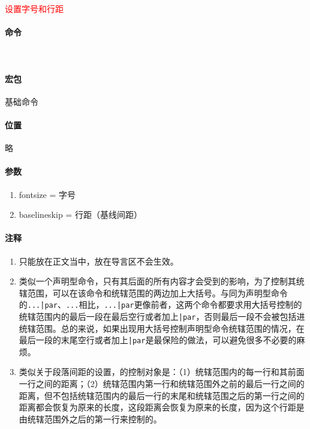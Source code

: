 \documentclass{article}
\newcommand{\mnt}[1]{\texttt{#1}} %
\newcommand{\notes}[6]{
    \begin{mdframed}
        {\begin{center}\large\textcolor{red}{#1}\end{center}}
        \paragraph{命令}~\vspace{10pt}\\#2
        \paragraph{宏包}#3
        \paragraph{位置}#4
        \paragraph{参数}#5
        \paragraph{注释}#6
    \end{mdframed}
}
\begin{document}
\notes
{设置字号和行距}%
{
    \mnt{\fontsize{fontsize}{baselineskip}{\selectfont...\|\mbox{}|par}}
}%
{基础命令}%
{略}%
{
    \begin{enumerate}
        \item fontsize = 字号
        \item baselineskip = 行距（基线间距）
    \end{enumerate}
}%
{
    \begin{enumerate}
        \item \mnt{\fontsize{}{}}只能放在正文当中，放在导言区不会生效。
        \item \mnt{\selectfont}类似一个声明型命令，只有其后面的所有内容才会受到\mnt{\fontsize{}{}}的影响，为了控制其统辖范围，可以在该命令和统辖范围的两边加上大括号。与同为声明型命令的\mnt{{\raggedleft...\|\mbox{}|par}}、\mnt{{\setlength{}{}...}}相比，\mnt{{\selectfont...\|\mbox{}|par}}更像前者，这两个命令都要求用大括号控制的统辖范围内的最后一段在最后空行或者加上\mnt{\|\mbox{}|par}，否则最后一段不会被包括进统辖范围。总的来说，如果出现用大括号控制声明型命令统辖范围的情况，在最后一段的末尾空行或者加上\mnt{\|\mbox{}|par}是最保险的做法，可以避免很多不必要的麻烦。
        \item 类似关于段落间距\mnt{\parskip}的设置，\mnt{\fontsize{}{}}的控制对象是：（1）统辖范围内的每一行和其前面一行之间的距离；（2）统辖范围内第一行和统辖范围外之前的最后一行之间的距离，但不包括统辖范围内的最后一行的末尾和统辖范围之后的第一行之间的距离都会恢复为原来的长度，这段距离会恢复为原来的长度，因为这个行距是由统辖范围外之后的第一行来控制的。
    \end{enumerate}
}%
\end{document}
